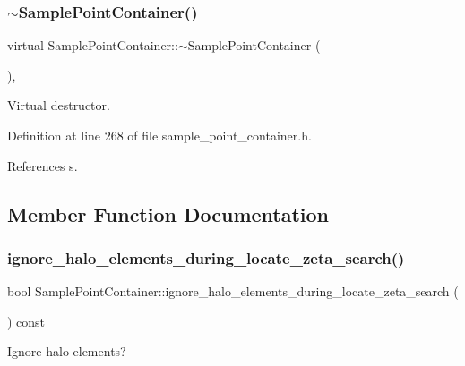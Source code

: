 \subsubsection{\texorpdfstring{$\sim$\+Sample\+Point\+Container()}{~SamplePointContainer()}}
{\footnotesize\ttfamily virtual Sample\+Point\+Container\+::$\sim$\+Sample\+Point\+Container (\begin{DoxyParamCaption}{ }\end{DoxyParamCaption})\hspace{0.3cm}{\ttfamily [inline]}, {\ttfamily [virtual]}}



Virtual destructor. 



Definition at line 268 of file sample\+\_\+point\+\_\+container.\+h.



References s.



\subsection{Member Function Documentation}
\mbox{\label{classSamplePointContainer_a399d246c1afdfd993ceb80e6f2de1400}} 
\subsubsection{\texorpdfstring{ignore\+\_\+halo\+\_\+elements\+\_\+during\+\_\+locate\+\_\+zeta\+\_\+search()}{ignore\_halo\_elements\_during\_locate\_zeta\_search()}}
{\footnotesize\ttfamily bool Sample\+Point\+Container\+::ignore\+\_\+halo\+\_\+elements\+\_\+during\+\_\+locate\+\_\+zeta\+\_\+search (\begin{DoxyParamCaption}{ }\end{DoxyParamCaption}) const\hspace{0.3cm}{\ttfamily [inline]}}



Ignore halo elements? 



